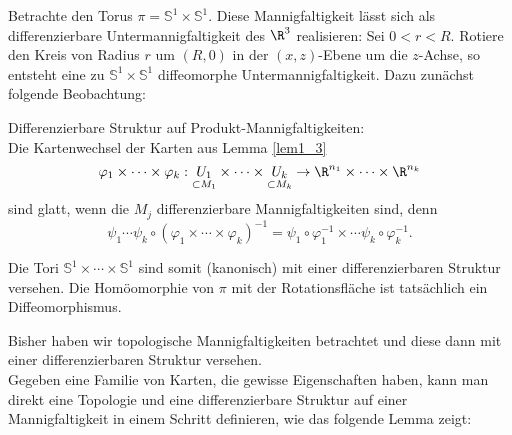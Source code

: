 \begin{exmp*}
	Betrachte den Torus $ \pi = \mathbb{S}^1 \times \mathbb{S}^1 $. Diese Mannigfaltigkeit lässt sich als differenzierbare Untermannigfaltigkeit des $\R^3$ realisieren: Sei $ 0 < r < R $. Rotiere den Kreis von Radius $r$ um $ (R,0) $ in der $(x,z)$-Ebene um die $z$-Achse, so entsteht eine zu $ \mathbb{S}^1 \times \mathbb{S}^1 $ diffeomorphe Untermannigfaltigkeit. Dazu zunächst folgende Beobachtung:
	\begin{rem}
		Differenzierbare Struktur auf Produkt-Mannigfaltigkeiten:\\
		Die Kartenwechsel der Karten aus Lemma \ref{lem1_3} 
		\[ \varphi_1 \times \dotsm \times \varphi_k: \underset{\subset M_1}{U_1} \times \dotsm \times \underset{\subset M_k}{U_k} \to \R^{n_1} \times \dotsm \times \R^{n_k} \]
		sind glatt, wenn die $M_j$ differenzierbare Mannigfaltigkeiten sind, denn 
		\[ \psi_1 \dotsm \psi_k \circ (\varphi_1 \times \dotsm \times \varphi_k)^{-1} = \psi_1 \circ \varphi_1^{-1} \times \dotsm \psi_k \circ \varphi_k^{-1}. \]
	\end{rem}
	Die Tori $ \mathbb{S}^1 \times \dotsm \times \mathbb{S}^1 $ sind somit (kanonisch) mit einer differenzierbaren Struktur versehen. Die Homöomorphie von $\pi$ mit der Rotationsfläche ist tatsächlich ein Diffeomorphismus.
\end{exmp*}

\begin{rem*}
	Bisher haben wir topologische Mannigfaltigkeiten betrachtet und diese dann mit einer differenzierbaren Struktur versehen.\\
	Gegeben eine Familie von Karten, die gewisse Eigenschaften haben, kann man direkt eine Topologie und eine differenzierbare Struktur auf einer Mannigfaltigkeit in einem Schritt definieren, wie das folgende Lemma zeigt:
\end{rem*}

